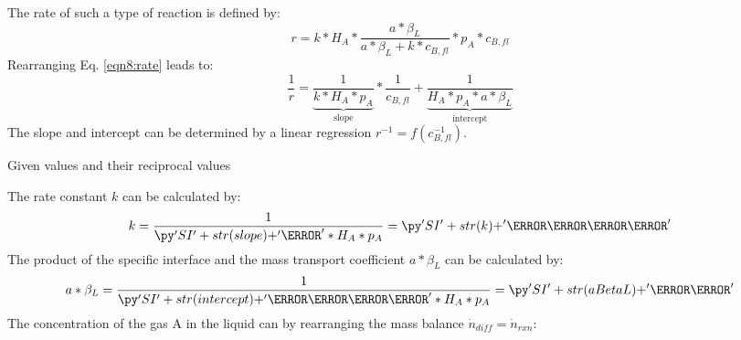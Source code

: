 \begin{solution}
The rate of such a type of reaction is defined by:
\begin{equation}\label{eqn8:rate}
 r = k * H_A * \frac{a * \beta_L}{a * \beta_L + k * c_{B,fl}} * p_A * c_{B,fl}
\end{equation}
Rearranging Eq. \ref{eqn8:rate} leads to:
\begin{equation}
 \frac{1}{r} = \underbrace{\frac{1}{k * H_A * p_A}}_{\text{slope}} * \frac{1}{c_{B,fl}} + \underbrace{\frac{1}{H_A * p_A * a * \beta_L}}_{\text{intercept}}
\end{equation}
The slope and intercept can be determined by a linear regression $r^{-1} = f\left(c_{B,fl}^{-1}\right)$.
\begin{table}[H]
\centering
\caption{Given values and their reciprocal values}
\label{tab8:1}
\end{table}
\begin{center}

\end{center}
The rate constant $k$ can be calculated by:
\begin{equation}
 k = \frac{1}{\pySI{slope}{\second} * H_A * p_A} = \pySI{k}{\liter\per\mole\second}
\end{equation}
The product of the specific interface and the mass transport coefficient $a * \beta_L$ can be calculated by:
\begin{equation}
 a * \beta_L = \frac{1}{\pySI{intercept}{\liter\second\per\mole} * H_A * p_A} = \pySI{aBetaL}{\per\second}
\end{equation}
The concentration of the gas A in the liquid can by rearranging the mass balance $ \dot{n}_{diff} = \dot{n}_{rxn}$:
\begin{align}

\end{align}
\end{solution}
